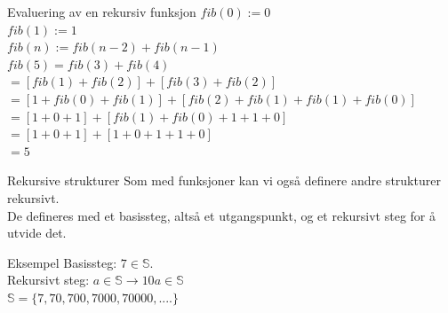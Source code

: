 \begin{frame}{Evaluering av en rekursiv funksjon}
    $fib(0) := 0$\\
    $fib(1) := 1$\\
    $fib(n) := fib(n-2) + fib(n-1)$\\
    
    \pause
    $fib(5) = fib(3) + fib(4)$\\
    $ = [fib(1) + fib(2)] + [fib(3) + fib(2)]$\\
    $ = [1 + fib(0) + fib(1)] + [fib(2) + fib(1) + fib(1) + fib(0)]$\\
    $ = [1 + 0 + 1] + [fib(1) + fib(0) + 1 + 1 + 0]$\\
    $ = [1 + 0 + 1] + [1 + 0 + 1 + 1 + 0]$\\
    $ = 5$
\end{frame}

\begin{frame}{Rekursive strukturer}
    Som med funksjoner kan vi også definere andre strukturer rekursivt.\\
    
    De defineres med et basissteg, altså et utgangspunkt, og et rekursivt steg for å utvide det.\\
    
    \pause
    \begin{block}{Eksempel}
        Basissteg: $7 \in \mathbb{S}$.\\
        Rekursivt steg: $a \in \mathbb{S} \rightarrow 10a \in \mathbb{S}$\\
        $\mathbb{S} = \{7, 70, 700, 7000, 70000, ....\}$
    \end{block}
\end{frame}

